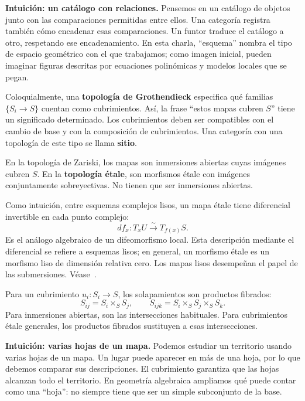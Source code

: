 \documentclass[12pt,openany]{memoir}
\begin{document}
\begin{ptcb}
\textbf{Intuición: un catálogo con relaciones.}
Pensemos en un catálogo de objetos junto con las comparaciones permitidas
entre ellos. Una categoría registra también cómo encadenar esas comparaciones.
Un funtor traduce el catálogo a otro, respetando ese encadenamiento.
En esta charla, ``esquema'' nombra el tipo de espacio geométrico con el que
trabajamos; como imagen inicial, pueden imaginar figuras descritas por
ecuaciones polinómicas y modelos locales que se pegan.
\end{ptcb}

\begin{ptcb}
Coloquialmente, una \textbf{topología de Grothendieck} especifica qué familias
\(\{S_i\to S\}\) cuentan como cubrimientos. Así, la frase ``estos mapas
cubren \(S\)'' tiene un significado determinado. Los cubrimientos deben ser
compatibles con el cambio de base y con la composición de cubrimientos.
Una categoría con una topología de este tipo se llama \textbf{sitio}.
\end{ptcb}

En la topología de Zariski, los mapas son inmersiones abiertas cuyas imágenes
cubren \(S\). En la \textbf{topología \'etale}, son morfismos \'etale con
imágenes conjuntamente sobreyectivas. No tienen que ser inmersiones abiertas.

Como intuición, entre esquemas complejos lisos, un mapa \'etale tiene
diferencial invertible en cada punto complejo:
\[
  d f_x:T_xU\xrightarrow{\sim}T_{f(x)}S.
\]
Es el análogo algebraico de un difeomorfismo local. Esta descripción mediante
el diferencial se refiere a esquemas lisos; en general, un morfismo \'etale
es un morfismo liso de dimensión relativa cero. Los mapas lisos desempeñan
el papel de las submersiones. Véase~\cite{sp:etale,sp:covers}.

Para un cubrimiento \(u_i:S_i\to S\), los solapamientos son productos
fibrados:
\[
  S_{ij}=S_i\times_S S_j,
  \qquad S_{ijk}=S_i\times_S S_j\times_S S_k.
\]
Para inmersiones abiertas, son las intersecciones habituales. Para
cubrimientos \'etale generales, los productos fibrados sustituyen a esas
intersecciones.

\begin{ptcb}
\textbf{Intuición: varias hojas de un mapa.}
Podemos estudiar un territorio usando varias hojas de un mapa. Un lugar
puede aparecer en más de una hoja, por lo que debemos comparar sus
descripciones. El cubrimiento garantiza que las hojas alcanzan todo el
territorio. En geometría algebraica ampliamos qué puede contar como una
``hoja'': no siempre tiene que ser un simple subconjunto de la base.
\end{ptcb}
\end{document}
